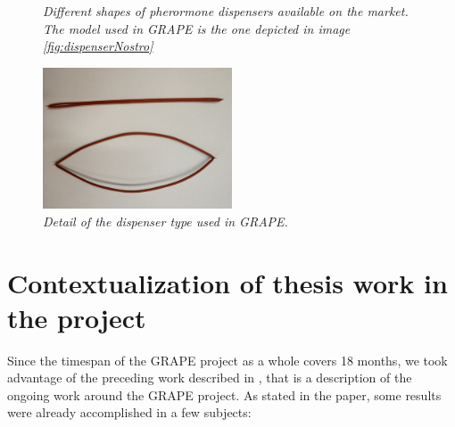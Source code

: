\begin{figure}
\begin{minipage}[]{.5\textwidth}
{		\label{fig:dispenserNostro}}
	\end{minipage}
	\caption{\textit{Different shapes of pherormone dispensers available on the market. The model used in \ac{GRAPE} is the one depicted in image \ref{fig:dispenserNostro}}}
	\label{fig:dispensers}
\end{figure}


\begin{figure}
	\centering
	\includegraphics[width=0.5\textwidth]{Images/grape_project/dispenserNostroVicino.jpg}
	\caption{\textit{Detail of the dispenser type used in \ac{GRAPE}.}}
	\label{fig:dispenserNostroDettaglio}
\end{figure}

\section{Contextualization of thesis work in the project} \label{sec:thesisInGrape}

 Since the timespan of the \ac{GRAPE} project as a whole covers 18 months, we took advantage of the preceding work described in \cite{grapeAltroPaper}, that is a description of the ongoing work around the \ac{GRAPE} project. As stated in the paper, some results were already accomplished in a few subjects:

